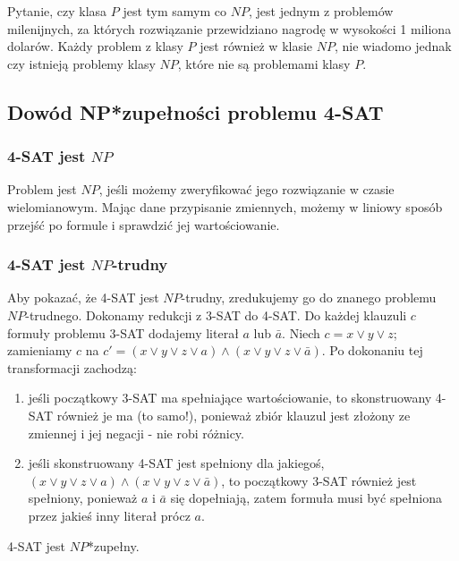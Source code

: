 
Pytanie, czy klasa $P$ jest tym samym co $NP$, jest jednym z problemów milenijnych,
za których rozwiązanie przewidziano nagrodę w wysokości 1 miliona dolarów.
Każdy problem z klasy $P$ jest również w klasie $NP$,
nie wiadomo jednak czy istnieją problemy klasy $NP$, które nie są problemami klasy $P$.

\subsection{Dowód NP*zupełności problemu 4-SAT}

\subsubsection{4-SAT jest $NP$}
Problem jest $NP$, jeśli możemy zweryfikować jego rozwiązanie w czasie wielomianowym.
Mając dane przypisanie zmiennych, możemy w liniowy sposób przejść po formule i sprawdzić jej wartościowanie.

\subsubsection{4-SAT jest $NP$-trudny}

Aby pokazać, że 4-SAT jest $NP$-trudny, zredukujemy go do znanego problemu $NP$-trudnego.
Dokonamy redukcji z 3-SAT do 4-SAT.
Do każdej klauzuli $c$ formuły problemu 3-SAT dodajemy literał $a$ lub $\bar{a}$.
Niech $c=x \lor y \lor z$;
zamieniamy $c$ na $c'=(x \lor y \lor z \lor a) \land (x \lor y \lor z \lor \bar{a})$.
Po dokonaniu tej transformacji zachodzą:
\begin{enumerate}[itemsep=0pt,partopsep=0pt, parsep=0pt]
    \item jeśli początkowy 3-SAT ma spełniające wartościowanie, to skonstruowany 4-SAT również je ma (to samo!),
    ponieważ zbiór klauzul jest złożony ze zmiennej i jej negacji - nie robi różnicy.
    \item jeśli skonstruowany 4-SAT jest spełniony dla jakiegoś,
    $(x \lor y \lor z \lor a) \land (x \lor y \lor z \lor \bar{a})$, to początkowy 3-SAT również jest spełniony,
    ponieważ $a$ i $\bar{a}$ się dopełniają, zatem formuła musi być spełniona przez jakieś inny literał prócz $a$.
\end{enumerate}

4-SAT jest $NP$*zupełny.
